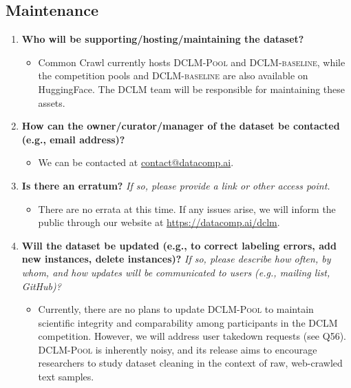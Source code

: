 \documentclass{article}
\makeatletter
\newcommand{\dclm}{\textsc{DCLM}\xspace}
\newcommand{\rawpool}{\textsc{DCLM-Pool}\xspace}
\newcommand{\hqpool}{\textsc{DCLM-baseline}\xspace}
\newcommand{\ourcode}{\url{https://datacomp.ai/dclm}\xspace}
\newcommand{\contactus}{\url{contact@datacomp.ai}\xspace}
\makeatother
\begin{document}
\subsection{Maintenance}

\begin{enumerate}[label=Q\arabic*, resume]

\item \textbf{Who will be supporting/hosting/maintaining the dataset?}

\begin{itemize}
\item Common Crawl currently hosts \rawpool and \hqpool, while the competition pools and \hqpool are also available on HuggingFace. The \dclm team will be responsible for maintaining these assets.
\end{itemize}

\item \textbf{How can the owner/curator/manager of the dataset be contacted (e.g., email address)?}

\begin{itemize}
\item We can be contacted at \contactus.
\end{itemize}

\item \textbf{Is there an erratum?} \textit{If so, please provide a link or other access point.}

\begin{itemize}
\item There are no errata at this time. If any issues arise, we will inform the public through our website at \ourcode.
\end{itemize}

\item \textbf{Will the dataset be updated (e.g., to correct labeling errors, add new instances, delete instances)?} \textit{If so, please describe how often, by whom, and how updates will be communicated to users (e.g., mailing list, GitHub)?}

\begin{itemize}
\item Currently, there are no plans to update \rawpool to maintain scientific integrity and comparability among participants in the \dclm competition. However, we will address user takedown requests (see Q56). \rawpool is inherently noisy, and its release aims to encourage researchers to study dataset cleaning in the context of raw, web-crawled text samples.
\end{itemize}


\end{enumerate}
\end{document}
